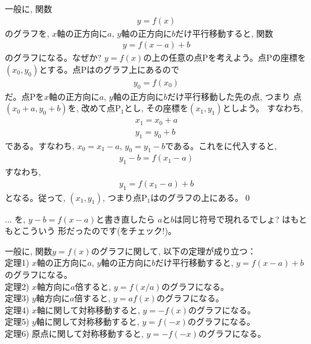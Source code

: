 一般に, 関数
\begin{eqnarray}y=f(x)\label{eq:y_fx}\end{eqnarray}のグラフを, 
$x$軸の正方向に$a$, $y$軸の正方向に$b$だけ平行移動すると, 
関数
\begin{eqnarray}
y=f(x-a)+b\label{eq:y_fxab}
\end{eqnarray}
のグラフになる。なぜか? $y=f(x)$の上の任意の点Pを考えよう。点Pの座標を
$(x_0, y_0)$とする。点Pはのグラフ上にあるので
\begin{eqnarray}
y_0=f(x_0)\label{eq:y0x0}
\end{eqnarray}
だ。点Pを$x$軸の正方向に$a$, $y$軸の正方向に$b$だけ平行移動した先の点, つまり
点$(x_0+a, y_0+b)$を, 改めて点P$_1$とし, その座標を$(x_1, y_1)$としよう。
すなわち, 
\begin{eqnarray}
x_1=x_0+a\\
y_1=y_0+b
\end{eqnarray}
である。すなわち, $x_0=x_1-a,\, y_0=y_1-b$である。これをに代入すると, 
\begin{eqnarray}
y_1-b=f(x_1-a)\label{eq:y_fxab4}
\end{eqnarray}
すなわち, 
\begin{eqnarray}
y_1=f(x_1-a)+b
\end{eqnarray}
となる。従って, $(x_1, y_1)$, つまり点P$_1$はのグラフの上にある。\qed

\begin{faq}{\small{} ... を, $y-b=f(x-a)$と書き直したら
$a$と$b$は同じ符号で現れるでしょ? はもともとこういう
形だったのです(をチェック!)。}\end{faq}

一般に, 関数$y=f(x)$のグラフに関して, 以下の定理が成り立つ：\\
定理1) $x$軸の正方向に$a$, $y$軸の正方向に$b$だけ平行移動すると, $y=f(x-a)+b$のグラフになる。\\
定理2) $x$軸方向に$a$倍すると, $y=f(x/a)$のグラフになる。\\
定理3) $y$軸方向に$a$倍すると, $y=af(x)$のグラフになる。\\ 
定理4) $x$軸に関して対称移動すると, $y=-f(x)$のグラフになる。\\
定理5) $y$軸に関して対称移動すると, $y=f(-x)$のグラフになる。\\
定理6) 原点に関して対称移動すると, $y=-f(-x)$のグラフになる。\mv

